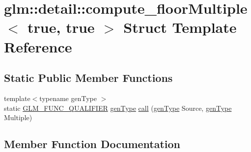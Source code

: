 \hypertarget{structglm_1_1detail_1_1compute__floor_multiple_3_01true_00_01true_01_4}{}\section{glm\+:\+:detail\+:\+:compute\+\_\+floor\+Multiple$<$ true, true $>$ Struct Template Reference}
\label{structglm_1_1detail_1_1compute__floor_multiple_3_01true_00_01true_01_4}
\subsection*{Static Public Member Functions}
\begin{DoxyCompactItemize}
\item 
{\footnotesize template$<$typename gen\+Type $>$ }\\static \hyperlink{setup_8hpp_a33fdea6f91c5f834105f7415e2a64407}{G\+L\+M\+\_\+\+F\+U\+N\+C\+\_\+\+Q\+U\+A\+L\+I\+F\+I\+ER} \hyperlink{structglm_1_1detail_1_1gen_type}{gen\+Type} \hyperlink{structglm_1_1detail_1_1compute__floor_multiple_3_01true_00_01true_01_4_a18fef0ea82a4549501b832f4571ab1c5}{call} (\hyperlink{structglm_1_1detail_1_1gen_type}{gen\+Type} Source, \hyperlink{structglm_1_1detail_1_1gen_type}{gen\+Type} Multiple)
\end{DoxyCompactItemize}


\subsection{Member Function Documentation}
\mbox{\label{structglm_1_1detail_1_1compute__floor_multiple_3_01true_00_01true_01_4_a18fef0ea82a4549501b832f4571ab1c5}} 
